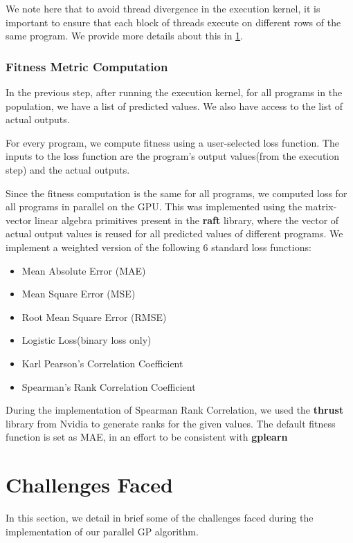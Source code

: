 We note here that to avoid thread divergence in the execution kernel, it is important to ensure that each block of threads execute on different rows of the same program. We provide more details about this in \cref*{sec:challenges}.

\subsubsection{Fitness Metric Computation}
\label{subsec:fitness}
In the previous step, after running the execution kernel, for all programs in the population, we have a list of predicted values. We also have access to the list of actual outputs. 

For every program, we compute fitness using a user-selected loss function. The inputs to the loss function are the program's output values(from the execution step) and the actual outputs.

Since the fitness computation is the same for all programs, we computed loss for all programs in parallel on the GPU. This was implemented using the matrix-vector linear algebra primitives present in the \textbf{raft} library\citep{raschka2020machine}, where the vector of actual output values is reused for all predicted values of different programs. We implement a weighted version of the following $6$ standard loss functions:
\begin{itemize}
    \item Mean Absolute Error (MAE)
    \item Mean Square Error (MSE)
    \item Root Mean Square Error (RMSE)
    \item Logistic Loss(binary loss only)
    \item Karl Pearson's Correlation Coefficient
    \item Spearman's Rank Correlation Coefficient
\end{itemize}
During the implementation of Spearman Rank Correlation, we used the \textbf{thrust} library from Nvidia to generate ranks for the given values. The default fitness function is set as MAE, in an effort to be consistent with \textbf{gplearn} \citep{gplearn}

\section{Challenges Faced}
\label{sec:challenges}
In this section, we detail in brief some of the challenges faced during the implementation of our parallel GP algorithm.


